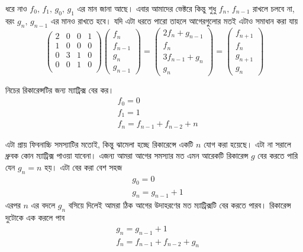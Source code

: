 ধরে নাও $f_{0}, \, f_{1}, \, g_{0}, \, g_{1}$ এর মান জানা আছে। এবার আমাদের ভেক্টরে কিন্তু শুধু $f_{n}, \, f_{n - 1}$ রাখলে চলবে না, বরং $g_{n}, \, g_{n - 1}$ এর মানও রাখতে হবে। যদি এটা ধরতে পারো তাহলে আগেরগুলোর মতই এটাও সমাধান করা যায়
$$
\begin{pmatrix}
2 & 0 & 0 & 1 \\
1 & 0 & 0 & 0 \\
0 & 3 & 1 & 0 \\
0 & 0 & 1 & 0 \\
\end{pmatrix}
\begin{pmatrix}
f_{n} \\
f_{n - 1} \\
g_{n} \\
g_{n - 1}
\end{pmatrix}
=
\begin{pmatrix}
2f_{n} + g_{n - 1}\\
f_{n} \\
3f_{n - 1} + g_{n} \\
g_{n}
\end{pmatrix}
=
\begin{pmatrix}
f_{n + 1} \\
f_{n} \\
g_{n + 1} \\
g_{n}
\end{pmatrix}
$$

\begin{problem}
নিচের রিকারেন্সটির জন্য ম্যাট্রিক্স বের কর।
\begin{align*}
& f_{0} = 0 \\
& f_{1} = 1 \\
& f_{n} = f_{n - 1} + f_{n - 2} + n
\end{align*}
\end{problem}
\begin{solution}
এটা প্রায় ফিবনাচ্চি সমস্যাটির মতোই, কিন্তু ঝামেলা হচ্ছে রিকারেন্সে একটি $n$ যোগ করা হয়েছে। এটা না সরালে ধ্রুবক কোন ম্যাট্রিক্স পাওয়া যাবেনা। এজন্য আমরা আগের সমস্যার মত এমন আরেকটি রিকারেন্স $g$ বের করতে পারি যেন $g_{n} = n$ হয়। এটা বের করা বেশ সহজ
\begin{align*}
& g_{0} = 0 \\
& g_{n} = g_{n - 1} + 1
\end{align*}
এরপর $n$ এর বদলে $g_{n}$ বসিয়ে দিলেই আমরা ঠিক আগের উদাহরণের মত ম্যাট্রিক্সটি বের করতে পারব। রিকারেন্স দুটোকে এক করলে পাব
\begin{align*}
& g_{n} = g_{n - 1} + 1 \\
& f_{n} = f_{n - 1} + f_{n - 2} + g_{n}
\end{align*}
\end{solution}

